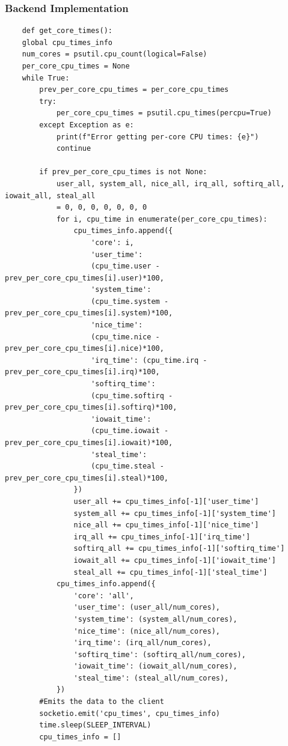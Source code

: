 \documentclass[12pt]{article}
\begin{document}
\subsubsection{Backend Implementation}
\begin{verbatim}
    def get_core_times():
    global cpu_times_info
    num_cores = psutil.cpu_count(logical=False)
    per_core_cpu_times = None
    while True:
        prev_per_core_cpu_times = per_core_cpu_times
        try:
            per_core_cpu_times = psutil.cpu_times(percpu=True)
        except Exception as e:
            print(f"Error getting per-core CPU times: {e}")
            continue
        
        if prev_per_core_cpu_times is not None:
            user_all, system_all, nice_all, irq_all, softirq_all, iowait_all, steal_all 
            = 0, 0, 0, 0, 0, 0, 0 
            for i, cpu_time in enumerate(per_core_cpu_times):
                cpu_times_info.append({
                    'core': i,
                    'user_time':
                    (cpu_time.user - prev_per_core_cpu_times[i].user)*100,
                    'system_time': 
                    (cpu_time.system - prev_per_core_cpu_times[i].system)*100,
                    'nice_time': 
                    (cpu_time.nice - prev_per_core_cpu_times[i].nice)*100,
                    'irq_time': (cpu_time.irq - prev_per_core_cpu_times[i].irq)*100,
                    'softirq_time': 
                    (cpu_time.softirq - prev_per_core_cpu_times[i].softirq)*100,
                    'iowait_time': 
                    (cpu_time.iowait - prev_per_core_cpu_times[i].iowait)*100,
                    'steal_time': 
                    (cpu_time.steal - prev_per_core_cpu_times[i].steal)*100,
                })
                user_all += cpu_times_info[-1]['user_time']
                system_all += cpu_times_info[-1]['system_time']
                nice_all += cpu_times_info[-1]['nice_time']
                irq_all += cpu_times_info[-1]['irq_time']
                softirq_all += cpu_times_info[-1]['softirq_time']
                iowait_all += cpu_times_info[-1]['iowait_time']
                steal_all += cpu_times_info[-1]['steal_time']
            cpu_times_info.append({
                'core': 'all',
                'user_time': (user_all/num_cores),
                'system_time': (system_all/num_cores),
                'nice_time': (nice_all/num_cores),
                'irq_time': (irq_all/num_cores),
                'softirq_time': (softirq_all/num_cores),
                'iowait_time': (iowait_all/num_cores),
                'steal_time': (steal_all/num_cores),
            })
        #Emits the data to the client
        socketio.emit('cpu_times', cpu_times_info)
        time.sleep(SLEEP_INTERVAL)
        cpu_times_info = []
\end{verbatim}
\end{document}
